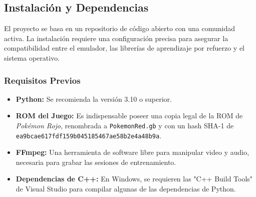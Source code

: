 \documentclass[12pt, oneside, openany]{book}
\begin{document}
\subsection{Instalación y Dependencias}
El proyecto se basa en un repositorio de código abierto con una comunidad activa. La instalación requiere una configuración precisa para asegurar la compatibilidad entre el emulador, las librerías de aprendizaje por refuerzo y el sistema operativo.

\subsubsection{Requisitos Previos}
\begin{itemize}
    \item \textbf{Python:} Se recomienda la versión 3.10 o superior.
    \item \textbf{ROM del Juego:} Es indispensable poseer una copia legal de la ROM de \textit{Pokémon Rojo}, renombrada a \texttt{PokemonRed.gb} y con un hash SHA-1 de \texttt{ea9bcae617fdf159b045185467ae58b2e4a48b9a}.
    \item \textbf{FFmpeg:} Una herramienta de software libre para manipular video y audio, necesaria para grabar las sesiones de entrenamiento.
    \item \textbf{Dependencias de C++:} En Windows, se requieren las "C++ Build Tools" de Visual Studio para compilar algunas de las dependencias de Python.
\end{itemize}
\end{document}
